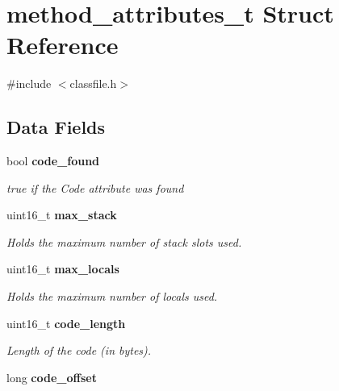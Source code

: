 \section{method\_\-attributes\_\-t Struct Reference}
\label{structmethod__attributes__t}


{\ttfamily \#include $<$classfile.h$>$}

\subsection*{Data Fields}
\begin{DoxyCompactItemize}
\item 
bool {\bf code\_\-found}\label{structmethod__attributes__t_ad272159b67edbdf2a0649f1a3fb3dc93}

\begin{DoxyCompactList}\small\item\em true if the Code attribute was found \item\end{DoxyCompactList}\item 
uint16\_\-t {\bf max\_\-stack}\label{structmethod__attributes__t_ad53319fbc32c45f4fdc05369be03eb05}

\begin{DoxyCompactList}\small\item\em Holds the maximum number of stack slots used. \item\end{DoxyCompactList}\item 
uint16\_\-t {\bf max\_\-locals}\label{structmethod__attributes__t_ade5c564bebfd2c04dae2a6c211b67d48}

\begin{DoxyCompactList}\small\item\em Holds the maximum number of locals used. \item\end{DoxyCompactList}\item 
uint16\_\-t {\bf code\_\-length}\label{structmethod__attributes__t_a208d4e6dfd1a54ff19c5da69163cd05a}

\begin{DoxyCompactList}\small\item\em Length of the code (in bytes). \item\end{DoxyCompactList}\item 
long {\bf code\_\-offset}\label{structmethod__attributes__t_a7b6a0299b6ed9cc51bf1138065417886}


\end{DoxyCompactItemize}
